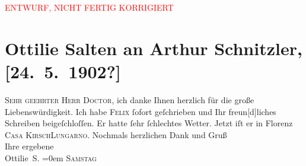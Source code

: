 
\begin{center}
            \textcolor{red}{ENTWURF, NICHT FERTIG KORRIGIERT}
                      \end{center}
            
         \renewcommand{\erwaehnteOrte}{Orte: Casa Kirsch, Wien}
         \renewcommand{\erwaehnteWerke}{}
               \section[Ottilie Salten an Arthur Schnitzler, {[}24. 5. 1902?{]}]{ Ottilie Salten an Arthur Schnitzler, {[}24. 5. 1902?{]}}\nopagebreak{}\rehead{ }\begin{ledgroupsized}[t]{13cm}\normalsize\beginnumbering \toendnotes[C]{\smallbreak\pagebreak[2]} 
\pstart
           \noindent{}{\pb}\textsc{Sehr geehrter Herr Doctor, } ich danke
               Ihnen herzlich für die große Liebenswürdigkeit. Ich habe \textsc{Felix} ſofort geſchrieben und Ihr freun{[}d{]}liches Schreiben
               beigeſchloſſen. Er hatte ſehr ſchlechtes Wetter. Jetzt iſt er in Florenz \textsc{Casa Kirsch}\textsc{Lungarno.}\pend
           \pstart
           Nochmals herzlichen Dank und Gruß{\\[\baselineskip]}Ihre ergebene {\\[\baselineskip]}\spacefill\mbox{Ottilie S.}\pend
           \leftskip=0em{}\pstart
           \textsc{Samstag}\pend
           
         
         \endnumbering{}\end{ledgroupsized}\begin{anhang}\end{anhang}\newcommand{\dateiname}{L03100}\newcommand{\titel}{Ottilie Salten an Arthur Schnitzler, [24. 5. 1902?]}\newcommand{\editorInnen}{Martin Anton Müller und Laura Untner}
      